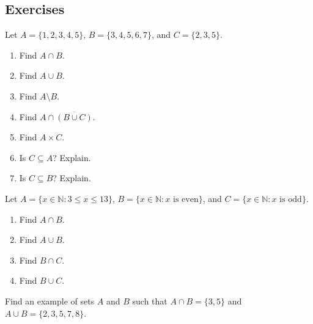 \documentclass[10pt,]{book}
\theoremstyle{plain}
\theoremstyle{definition}
\theoremstyle{definition}
\theoremstyle{definition}
\theoremstyle{definition}
\numberwithin{equation}{chapter}
\def\N{\mathbb N}
\def\st{:}
\begin{document}
\subsection*{Exercises}\label{exercises_intro-sets}
\begin{divisionexercise}{1}\hypertarget{exercise-187}{}
\hypertarget{p-1531}{}%
Let \(A = \{1,2,3,4,5\}\), \(B = \{3,4,5,6,7\}\), and \(C = \{2,3,5\}\).%
\par
\hypertarget{p-1532}{}%
\leavevmode%
\begin{enumerate}[label=(\alph*)]
\item\hypertarget{li-482}{}\hypertarget{p-1533}{}%
Find \(A \cap B\).%
\item\hypertarget{li-483}{}\hypertarget{p-1534}{}%
Find \(A \cup B\).%
\item\hypertarget{li-484}{}\hypertarget{p-1535}{}%
Find \(A \setminus B\).%
\item\hypertarget{li-485}{}\hypertarget{p-1536}{}%
Find \(A \cap \overline{(B \cup C)}\).%
\item\hypertarget{li-486}{}\hypertarget{p-1537}{}%
Find \(A \times C\).%
\item\hypertarget{li-487}{}\hypertarget{p-1538}{}%
Is \(C \subseteq A\)? Explain.%
\item\hypertarget{li-488}{}\hypertarget{p-1539}{}%
Is \(C \subseteq B\)? Explain.%
\end{enumerate}
%
\end{divisionexercise}%
\begin{divisionexercise}{2}\hypertarget{exercise-188}{}
\hypertarget{p-1543}{}%
Let \(A = \{x \in \N \st 3 \le x \le 13\}\), \(B = \{x \in \N \st x \mbox{ is even} \}\), and \(C = \{x \in \N \st x \mbox{ is odd} \}\).%
\par
\hypertarget{p-1544}{}%
\leavevmode%
\begin{enumerate}[label=(\alph*)]
\item\hypertarget{li-496}{}\hypertarget{p-1545}{}%
Find \(A \cap B\).%
\item\hypertarget{li-497}{}\hypertarget{p-1546}{}%
Find \(A \cup B\).%
\item\hypertarget{li-498}{}\hypertarget{p-1547}{}%
Find \(B \cap C\).%
\item\hypertarget{li-499}{}\hypertarget{p-1548}{}%
Find \(B \cup C\).%
\end{enumerate}
%
\end{divisionexercise}%
\begin{divisionexercise}{3}\hypertarget{exercise-189}{}
\hypertarget{p-1549}{}%
Find an example of sets \(A\) and \(B\) such that \(A\cap B = \{3, 5\}\) and \(A \cup B = \{2, 3, 5, 7, 8\}\).%
\end{divisionexercise}%
\end{document}
